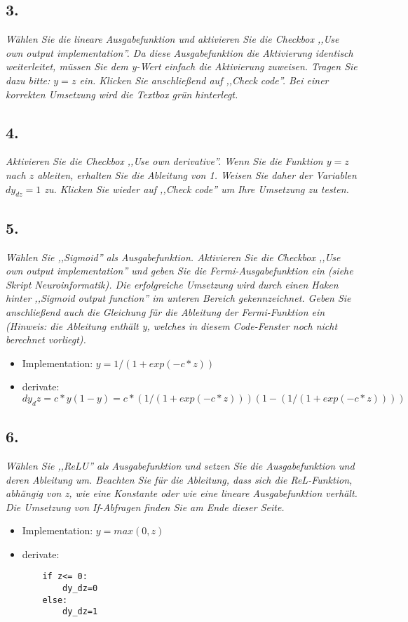 \documentclass[a4paper,10pt,titlepage]{scrartcl}
\begin{document}
\subsection*{3.}
\textit{Wählen Sie die lineare Ausgabefunktion und aktivieren Sie die Checkbox ,,Use own output implementation''. Da diese Ausgabefunktion die Aktivierung identisch weiterleitet, müssen Sie dem y-Wert einfach die Aktivierung zuweisen. Tragen Sie dazu bitte: $y=z$ ein. Klicken Sie anschließend auf ,,Check code''. Bei einer korrekten Umsetzung wird die Textbox grün hinterlegt.}

\subsection*{4.}
\textit{Aktivieren Sie die Checkbox ,,Use own derivative''. Wenn Sie die Funktion $y=z$ nach $z$ ableiten, erhalten Sie die Ableitung von 1. Weisen Sie daher der Variablen $dy_{dz} = 1$ zu. Klicken Sie wieder auf ,,Check code'' um Ihre Umsetzung zu testen.}

\subsection*{5.}
\textit{Wählen Sie ,,Sigmoid'' als Ausgabefunktion. Aktivieren Sie die Checkbox ,,Use own output implementation'' und geben Sie die Fermi-Ausgabefunktion ein (siehe Skript Neuroinformatik). Die erfolgreiche Umsetzung wird durch einen Haken hinter ,,Sigmoid output function'' im unteren Bereich gekennzeichnet. Geben Sie anschließend auch die Gleichung für die Ableitung der Fermi-Funktion ein (Hinweis: die Ableitung enthält y, welches in diesem Code-Fenster noch nicht berechnet vorliegt).}
\begin{itemize}
    \item Implementation: $y= 1/(1+exp(-c*z))$
    \item derivate: $dy_dz= c*y (1-y) = c*(1/(1+exp(-c*z))) (1-(1/(1+exp(-c*z))))$
\end{itemize}

\subsection*{6.}
\textit{Wählen Sie ,,ReLU'' als Ausgabefunktion und setzen Sie die Ausgabefunktion und deren Ableitung um. Beachten Sie für die Ableitung, dass sich die ReL-Funktion, abhängig von z, wie eine Konstante oder wie eine lineare Ausgabefunktion verhält. Die Umsetzung von If-Abfragen finden Sie am Ende dieser Seite.}
\begin{itemize}
    \item Implementation: $y=max(0,z)$
    \item derivate:
          \begin{lstlisting}
    if z<= 0:
        dy_dz=0
    else:
        dy_dz=1
    \end{lstlisting}
\end{itemize}
\end{document}
